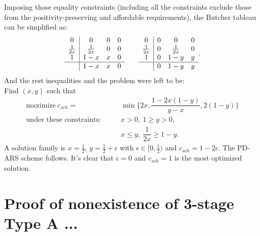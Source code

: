 Imposing those equality constraints (including all the constraints exclude those from the positivity-preserving and affordable requirements), the Butcher tableau can be simplified as:
\begin{equation}
  \begin{array}{c | c c c}
  	     0       & 0            & 0 & 0 \\
  	\frac{1}{2x} & \frac{1}{2x} & 0 & 0 \\
  	     1       & 1-x          & x & 0 \\ \hline
  	             & 1-x          & x & 0
  \end{array}
  \qquad
  \begin{array}{c | c c c}
  	     0       & 0 & 0            & 0 \\
  	\frac{1}{2x} & 0 & \frac{1}{2x} & 0 \\
  	     1       & 0 & 1-y          & y \\ \hline
  	             & 0 & 1-y          & y
  \end{array}.
\end{equation}
And the rest inequalities and the problem were left to be: \\
Find $(x,y)$ such that
\begin{align*}
\text{maximize} ~ c_{sch} = &\min \{ 2x, \dfrac{1-2x(1-y)}{y-x}, 2(1-y)\}\\
 \text{under these constraints:} \qquad & x > 0, ~ 1 \geq y > 0, \\
 & x \leq y, ~\dfrac{1}{2x} \geq 1-y.
\end{align*}
A solution family is $x=\frac{1}{2}$, $y=\frac{1}{2} + \epsilon$ with $\epsilon \in [0, \frac{1}{2})$ and $c_{sch} = 1 - 2\epsilon$.
The PD-ARS scheme follows.
It's clear that $\epsilon = 0$ and $c_{sch} = 1$ is the most optimized solution.

\section{Proof of nonexistence of 3-stage Type A ...}
\label{app:noTypeA}

